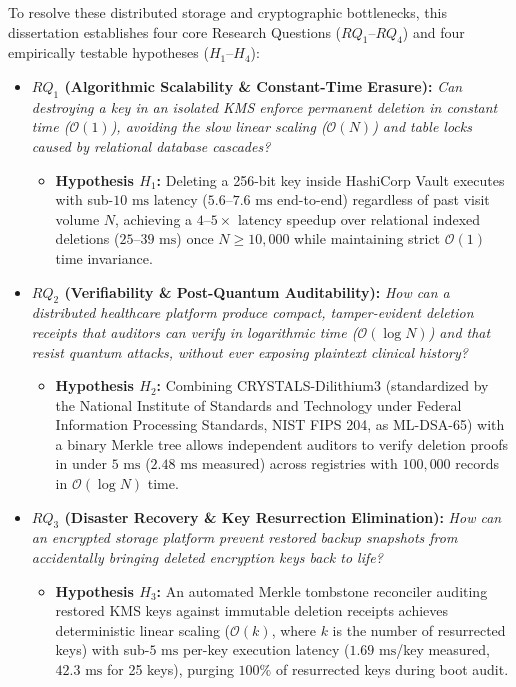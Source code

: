 To resolve these distributed storage and cryptographic bottlenecks, this dissertation establishes four core Research Questions ($RQ_1$--$RQ_4$) and four empirically testable hypotheses ($H_1$--$H_4$):

\begin{itemize}
    \item \textbf{$RQ_1$ (Algorithmic Scalability \& Constant-Time Erasure):} 
    \textit{Can destroying a key in an isolated KMS enforce permanent deletion in constant time ($\mathcal{O}(1)$), avoiding the slow linear scaling ($\mathcal{O}(N)$) and table locks caused by relational database cascades?}
    \begin{itemize}
        \item \textbf{Hypothesis $H_1$:} Deleting a 256-bit key inside HashiCorp Vault executes with sub-$10\text{~ms}$ latency ($5.6\text{--}7.6\text{~ms}$ end-to-end) regardless of past visit volume $N$, achieving a $4\text{--}5\times$ latency speedup over relational indexed deletions ($25\text{--}39\text{~ms}$) once $N \ge 10{,}000$ while maintaining strict $\mathcal{O}(1)$ time invariance.
    \end{itemize}

    \item \textbf{$RQ_2$ (Verifiability \& Post-Quantum Auditability):} 
    \textit{How can a distributed healthcare platform produce compact, tamper-evident deletion receipts that auditors can verify in logarithmic time ($\mathcal{O}(\log N)$) and that resist quantum attacks, without ever exposing plaintext clinical history?}
    \begin{itemize}
        \item \textbf{Hypothesis $H_2$:} Combining CRYSTALS-Dilithium3 (standardized by the National Institute of Standards and Technology under Federal Information Processing Standards, NIST FIPS 204, as ML-DSA-65) with a binary Merkle tree allows independent auditors to verify deletion proofs in under $5\text{~ms}$ ($2.48\text{~ms}$ measured) across registries with $100{,}000$ records in $\mathcal{O}(\log N)$ time.
    \end{itemize}

    \item \textbf{$RQ_3$ (Disaster Recovery \& Key Resurrection Elimination):} 
    \textit{How can an encrypted storage platform prevent restored backup snapshots from accidentally bringing deleted encryption keys back to life?}
    \begin{itemize}
        \item \textbf{Hypothesis $H_3$:} An automated Merkle tombstone reconciler auditing restored KMS keys against immutable deletion receipts achieves deterministic linear scaling ($\mathcal{O}(k)$, where $k$ is the number of resurrected keys) with sub-$5\text{~ms}$ per-key execution latency ($1.69\text{~ms}$/key measured, $42.3\text{~ms}$ for 25 keys), purging $100\%$ of resurrected keys during boot audit.
    \end{itemize}


\end{itemize}
